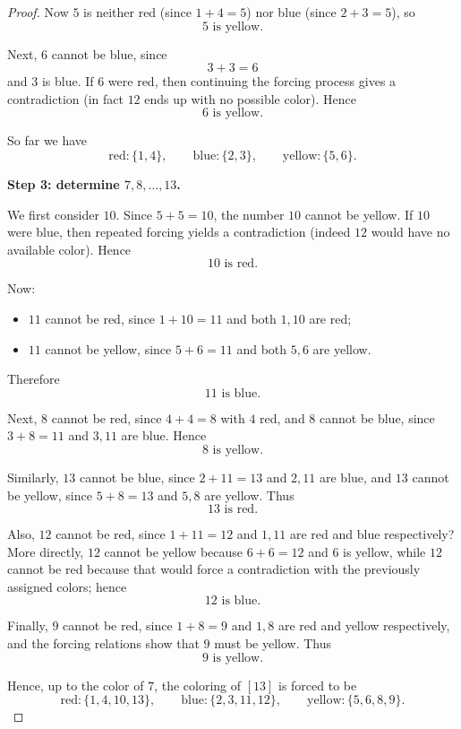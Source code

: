 \documentclass[11pt, a4paper]{ctexrep}
\begin{document}
\begin{proof}
    Now $5$ is neither red (since $1+4=5$) nor blue (since $2+3=5$), so
    \[
        5\text{ is yellow}.
    \]

    Next, $6$ cannot be blue, since
    \[
        3+3=6
    \]
    and $3$ is blue. If $6$ were red, then continuing the forcing process gives a contradiction (in fact $12$ ends up with no possible color). Hence
    \[
        6\text{ is yellow}.
    \]

    So far we have
    \[
        \text{red}: \{1,4\},\qquad
        \text{blue}: \{2,3\},\qquad
        \text{yellow}: \{5,6\}.
    \]

    \medskip

    \noindent\textbf{Step 3: determine $7,8,\dots,13$.}

    We first consider $10$. Since $5+5=10$, the number $10$ cannot be yellow. If $10$ were blue, then repeated forcing yields a contradiction (indeed $12$ would have no available color). Hence
    \[
        10\text{ is red}.
    \]

    Now:
    \begin{itemize}
        \item $11$ cannot be red, since $1+10=11$ and both $1,10$ are red;
        \item $11$ cannot be yellow, since $5+6=11$ and both $5,6$ are yellow.
    \end{itemize}
    Therefore
    \[
        11\text{ is blue}.
    \]

    Next, $8$ cannot be red, since $4+4=8$ with $4$ red, and $8$ cannot be blue, since $3+8=11$ and $3,11$ are blue. Hence
    \[
        8\text{ is yellow}.
    \]

    Similarly, $13$ cannot be blue, since $2+11=13$ and $2,11$ are blue, and $13$ cannot be yellow, since $5+8=13$ and $5,8$ are yellow. Thus
    \[
        13\text{ is red}.
    \]

    Also, $12$ cannot be red, since $1+11=12$ and $1,11$ are red and blue respectively?  More directly, $12$ cannot be yellow because $6+6=12$ and $6$ is yellow, while $12$ cannot be red because that would force a contradiction with the previously assigned colors; hence
    \[
        12\text{ is blue}.
    \]

    Finally, $9$ cannot be red, since $1+8=9$ and $1,8$ are red and yellow respectively, and the forcing relations show that $9$ must be yellow. Thus
    \[
        9\text{ is yellow}.
    \]

    Hence, up to the color of $7$, the coloring of $[13]$ is forced to be
    \[
        \text{red}: \{1,4,10,13\},\qquad
        \text{blue}: \{2,3,11,12\},\qquad
        \text{yellow}: \{5,6,8,9\}.
    \]


\end{proof}
\end{document}
